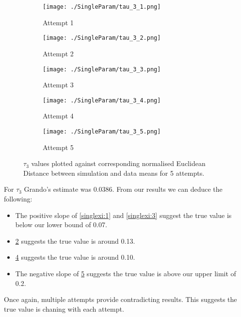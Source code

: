 \begin{figure}
    \begin{subfigure}{.3\textwidth}
      \centering
      \texttt{[image: ./SingleParam/tau\_3\_1.png]}
      \caption{Attempt 1}
      \label{singletau:1}
    \end{subfigure}
    \begin{subfigure}{.3\textwidth}
      \centering
      \texttt{[image: ./SingleParam/tau\_3\_2.png]}
      \caption{Attempt 2}
      \label{singletau:2}
    \end{subfigure}
    \begin{subfigure}{.3\textwidth}
        \centering
        \texttt{[image: ./SingleParam/tau\_3\_3.png]}
        \caption{Attempt 3}
        \label{singletau:3}
    \end{subfigure}

    \centering
    \begin{subfigure}{.3\textwidth} 
        \centering
        \texttt{[image: ./SingleParam/tau\_3\_4.png]}
        \caption{Attempt 4}
        \label{singletau:4}
    \end{subfigure}
    \begin{subfigure}{.3\textwidth}
        \centering
        \texttt{[image: ./SingleParam/tau\_3\_5.png]}
        \caption{Attempt 5}
        \label{singletau:5}
    \end{subfigure}

    \caption{$\tau_3$ values plotted against corresponding normalised Euclidean Distance between simulation and data means for 5 attempts.}
    \label{singletau}
\end{figure}


For $\tau_3$ Grando's estimate was 0.0386. From our results we can deduce the following:
\begin{itemize}
    \item The positive slope of \ref{singlexi:1} and \ref{singlexi:3} suggest the true value is below our lower bound of 0.07.
    \item \ref{singletau:2} suggests the true value is around 0.13.
    \item \ref{singletau:4} suggests the true value is around 0.10.
    \item The negative slope of \ref{singletau:5} suggests the true value is above our upper limit of 0.2.
\end{itemize}
Once again, multiple attempts provide contradicting results. This suggests the true value is chaning with each attempt.


